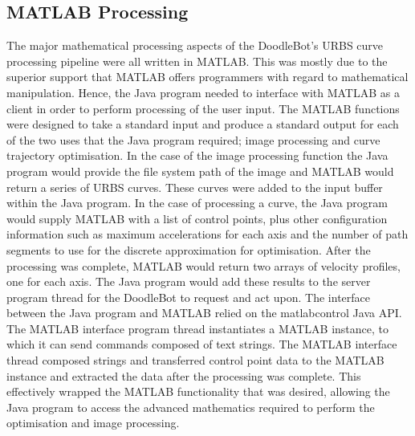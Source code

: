 \subsection{MATLAB\textsuperscript{\textregistered} Processing}
The major mathematical processing aspects of the DoodleBot's URBS curve processing pipeline were all written in MATLAB\textsuperscript{\textregistered}. This was mostly due to the superior support that MATLAB\textsuperscript{\textregistered} offers programmers with regard to mathematical manipulation. Hence, the Java program needed to interface with MATLAB\textsuperscript{\textregistered} as a client in order to perform processing of the user input. The MATLAB\textsuperscript{\textregistered} functions were designed to take a standard input and produce a standard output for each of the two uses that the Java program required; image processing and curve trajectory optimisation. In the case of the image processing function the Java program would provide the file system path of the image and MATLAB\textsuperscript{\textregistered} would return a series of URBS curves. These curves were added to the input buffer within the Java program. In the case of processing a curve, the Java program would supply MATLAB\textsuperscript{\textregistered} with a list of control points, plus other configuration information such as maximum accelerations for each axis and the number of path segments to use for the discrete approximation for optimisation. After the processing was complete, MATLAB\textsuperscript{\textregistered} would return two arrays of velocity profiles, one for each axis. The Java program would add these results to the server program thread for the DoodleBot to request and act upon. The interface between the Java program and MATLAB\textsuperscript{\textregistered} relied on the matlabcontrol Java API. The MATLAB\textsuperscript{\textregistered} interface program thread instantiates a MATLAB\textsuperscript{\textregistered} instance, to which it can send commands composed of text strings. The MATLAB\textsuperscript{\textregistered} interface thread composed strings and transferred control point data to the MATLAB\textsuperscript{\textregistered} instance and extracted the data after the processing was complete. This effectively wrapped the MATLAB\textsuperscript{\textregistered} functionality that was desired, allowing the Java program to access the advanced mathematics required to perform the optimisation and image processing.